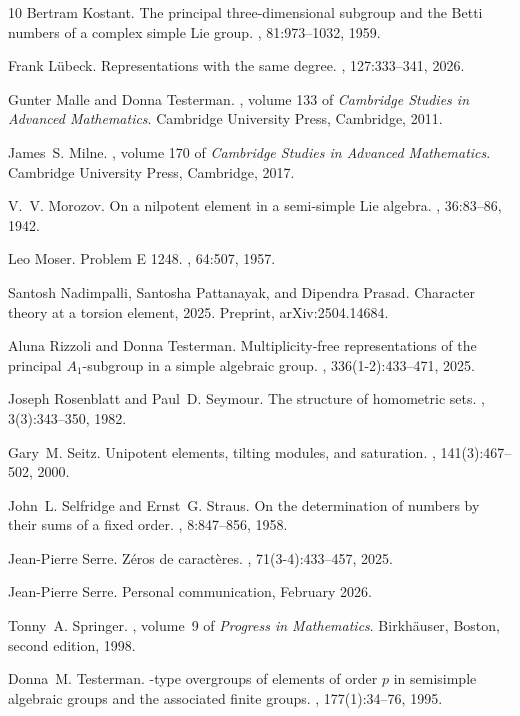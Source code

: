 \documentclass[11pt,a4paper]{article}
\theoremstyle{plain}
\theoremstyle{definition}
\begin{document}
\begin{thebibliography}{10}
Bertram Kostant.
\newblock The principal three-dimensional subgroup and the {B}etti numbers of a
  complex simple {L}ie group.
, 81:973--1032, 1959.

Frank L{\"u}beck.
\newblock Representations with the same degree.
, 127:333--341, 2026.

Gunter Malle and Donna Testerman.
, volume
  133 of {\em Cambridge Studies in Advanced Mathematics}.
\newblock Cambridge University Press, Cambridge, 2011.

James~S. Milne.
, volume 170 of {\em Cambridge Studies in Advanced Mathematics}.
\newblock Cambridge University Press, Cambridge, 2017.

V.~V. Morozov.
\newblock On a nilpotent element in a semi-simple {L}ie algebra.
, 36:83--86, 1942.

Leo Moser.
\newblock Problem {E} 1248.
, 64:507, 1957.

Santosh Nadimpalli, Santosha Pattanayak, and Dipendra Prasad.
\newblock Character theory at a torsion element, 2025.
\newblock Preprint, arXiv:2504.14684.

Aluna Rizzoli and Donna Testerman.
\newblock Multiplicity-free representations of the principal {$A_1$}-subgroup
  in a simple algebraic group.
, 336(1-2):433--471, 2025.

Joseph Rosenblatt and Paul~D. Seymour.
\newblock The structure of homometric sets.
, 3(3):343--350, 1982.

Gary~M. Seitz.
\newblock Unipotent elements, tilting modules, and saturation.
, 141(3):467--502, 2000.

John~L. Selfridge and Ernst~G. Straus.
\newblock On the determination of numbers by their sums of a fixed order.
, 8:847--856, 1958.

Jean-Pierre Serre.
\newblock Z\'eros de caract\`eres.
, 71(3-4):433--457, 2025.

Jean-Pierre Serre.
\newblock Personal communication, February 2026.

Tonny~A. Springer.
, volume~9 of {\em Progress in
  Mathematics}.
\newblock Birkh{\"a}user, Boston, second edition, 1998.

Donna~M. Testerman.
-type overgroups of elements of order $p$ in semisimple
  algebraic groups and the associated finite groups.
, 177(1):34--76, 1995.

\end{thebibliography}
\end{document}

